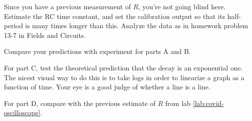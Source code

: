 Since you have a previous measurement of $R$, you're not going blind here.
Estimate the RC time constant, and set the calibration output so that its half-period
is many times longer than this. Analyze the data as in homework problem 13-7
in Fields and Circuits.



\analysis

Compare your predictions with experiment for parts A and B.

For part C, test the theoretical prediction that the decay is
an exponential one. The nicest visual way to do this is to take
logs in order to linearize a graph as a function of time. Your
eye is a good judge of whether a line is a line.

For part D, compare with the previous estimate of $R$ from lab \ref{lab:covid-oscilloscope}.
